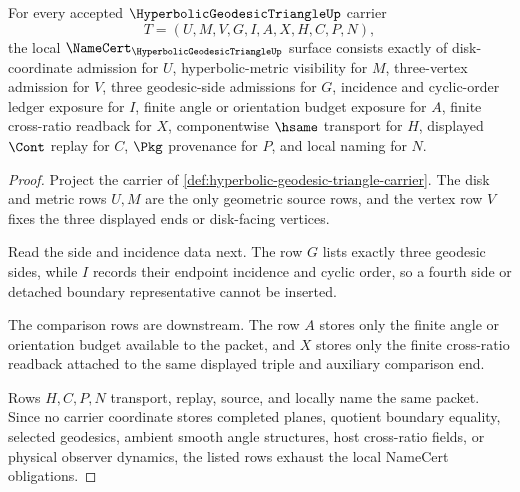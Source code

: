 \begin{theorem}
\label{thm:hyperbolic-geodesic-triangle-namecert-obligations}
For every accepted $\HyperbolicGeodesicTriangleUp$ carrier
$$
T=(U,M,V,G,I,A,X,H,C,P,N),
$$
the local $\NameCert_{\HyperbolicGeodesicTriangleUp}$ surface consists exactly of disk-coordinate admission for $U$, hyperbolic-metric visibility for $M$, three-vertex admission for $V$, three geodesic-side admissions for $G$, incidence and cyclic-order ledger exposure for $I$, finite angle or orientation budget exposure for $A$, finite cross-ratio readback for $X$, componentwise $\hsame$ transport for $H$, displayed $\Cont$ replay for $C$, $\Pkg$ provenance for $P$, and local naming for $N$.
\end{theorem}
\begin{proof}
Project the carrier of \autoref{def:hyperbolic-geodesic-triangle-carrier}. The disk and metric rows $U,M$ are the only geometric source rows, and the vertex row $V$ fixes the three displayed ends or disk-facing vertices.

Read the side and incidence data next. The row $G$ lists exactly three geodesic sides, while $I$ records their endpoint incidence and cyclic order, so a fourth side or detached boundary representative cannot be inserted.

The comparison rows are downstream. The row $A$ stores only the finite angle or orientation budget available to the packet, and $X$ stores only the finite cross-ratio readback attached to the same displayed triple and auxiliary comparison end.

Rows $H,C,P,N$ transport, replay, source, and locally name the same packet. Since no carrier coordinate stores completed planes, quotient boundary equality, selected geodesics, ambient smooth angle structures, host cross-ratio fields, or physical observer dynamics, the listed rows exhaust the local NameCert obligations.
\end{proof}

